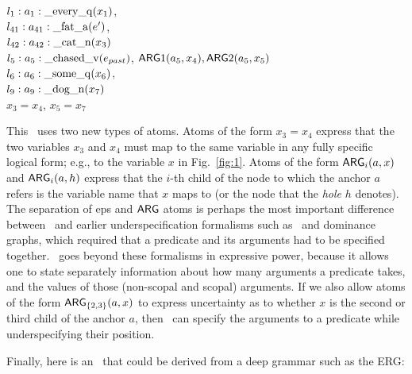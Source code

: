\begin{examples}
\item 
$l_1:a_1:\mathrm{\_every\_q}(x_1)$, \\
$l_{41}:a_{41}:\mathrm{\_fat\_a}(e')$,\\
$l_{42}:a_{42}:\mathrm{\_cat\_n}(x_3)$\\
$l_5:a_5:\mathrm{\_chased\_v}(e_{past})$, 
\hspace*{0.1in} $\mathsf{ARG}1(a_5,x_4),
\mathsf{ARG}2(a_5,x_5)$\\ 
$l_6:a_6:\mathrm{\_some\_q}(x_6)$, \\
$l_9:a_9:\mathrm{\_dog\_n}(x_7)$\\
$x_3=x_4$, $x_5=x_7$
\label{ex:cat-partial-parser}
\end{examples}

This \rmrs\ uses two new types of atoms.  Atoms of the form $x_3=x_4$
express that the two variables $x_3$ and $x_4$ must map to the same
variable in any fully specific logical form; e.g., to the variable $x$
in Fig.~\ref{fig:1}.  Atoms of the form
$\mathsf{ARG}_i(a,x)$ and $\mathsf{ARG}_i(a,h)$ express that the $i$-th child of the
node to which the anchor $a$ refers is the variable name that $x$ maps
to (or the node that the {\em hole} $h$ denotes).  The separation of
{\sc ep}s and $\mathsf{ARG}$ atoms is perhaps the most important difference between
\rmrs\ and earlier underspecification formalisms such as \mrs\ and
dominance graphs, which required that a predicate and its arguments
had to be specified together.  \rmrs\ goes beyond these formalisms in
expressive power, because it allows one to state separately
information about how many arguments a predicate takes, and the values of
those (non-scopal and scopal) arguments.   If we also allow atoms of the form
$\mathsf{ARG}_{\{2,3\}}(a,x)$ to express uncertainty as to whether $x$ is the
second or third child of the anchor $a$, then \rmrs\ can specify the
arguments to a predicate while underspecifying their position.  

Finally, here is an \rmrs\ that could be derived from a deep grammar
such as the ERG:

